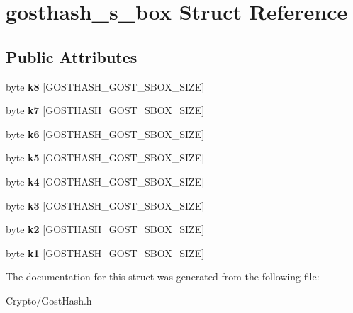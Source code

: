 \hypertarget{structgosthash__s__box}{}\section{gosthash\+\_\+s\+\_\+box Struct Reference}
\label{structgosthash__s__box}
\subsection*{Public Attributes}
\begin{DoxyCompactItemize}
\item 
\mbox{\label{structgosthash__s__box_a3d197771a7d2da7ac4707bc63b87f61c}} 
byte {\bfseries k8} \mbox{[}G\+O\+S\+T\+H\+A\+S\+H\+\_\+\+G\+O\+S\+T\+\_\+\+S\+B\+O\+X\+\_\+\+S\+I\+ZE\mbox{]}
\item 
\mbox{\label{structgosthash__s__box_a23fad2a24dd1a082d82e57c8334e9921}} 
byte {\bfseries k7} \mbox{[}G\+O\+S\+T\+H\+A\+S\+H\+\_\+\+G\+O\+S\+T\+\_\+\+S\+B\+O\+X\+\_\+\+S\+I\+ZE\mbox{]}
\item 
\mbox{\label{structgosthash__s__box_aced7243d963fadea4c40359e2ac7a1ba}} 
byte {\bfseries k6} \mbox{[}G\+O\+S\+T\+H\+A\+S\+H\+\_\+\+G\+O\+S\+T\+\_\+\+S\+B\+O\+X\+\_\+\+S\+I\+ZE\mbox{]}
\item 
\mbox{\label{structgosthash__s__box_a2af4278d76715e307addce40d681d2d0}} 
byte {\bfseries k5} \mbox{[}G\+O\+S\+T\+H\+A\+S\+H\+\_\+\+G\+O\+S\+T\+\_\+\+S\+B\+O\+X\+\_\+\+S\+I\+ZE\mbox{]}
\item 
\mbox{\label{structgosthash__s__box_ab076f1df3fda5cf0f4b1848211057fd2}} 
byte {\bfseries k4} \mbox{[}G\+O\+S\+T\+H\+A\+S\+H\+\_\+\+G\+O\+S\+T\+\_\+\+S\+B\+O\+X\+\_\+\+S\+I\+ZE\mbox{]}
\item 
\mbox{\label{structgosthash__s__box_a258c8f83ff8dcdd42f73c76802a43bf8}} 
byte {\bfseries k3} \mbox{[}G\+O\+S\+T\+H\+A\+S\+H\+\_\+\+G\+O\+S\+T\+\_\+\+S\+B\+O\+X\+\_\+\+S\+I\+ZE\mbox{]}
\item 
\mbox{\label{structgosthash__s__box_ac3d8d27113a80323e239f92ccd8ba56c}} 
byte {\bfseries k2} \mbox{[}G\+O\+S\+T\+H\+A\+S\+H\+\_\+\+G\+O\+S\+T\+\_\+\+S\+B\+O\+X\+\_\+\+S\+I\+ZE\mbox{]}
\item 
\mbox{\label{structgosthash__s__box_a1dbb3ae14727c8efd9e4145a4c5eb60f}} 
byte {\bfseries k1} \mbox{[}G\+O\+S\+T\+H\+A\+S\+H\+\_\+\+G\+O\+S\+T\+\_\+\+S\+B\+O\+X\+\_\+\+S\+I\+ZE\mbox{]}
\end{DoxyCompactItemize}


The documentation for this struct was generated from the following file\+:\begin{DoxyCompactItemize}
\item 
Crypto/Gost\+Hash.\+h\end{DoxyCompactItemize}
